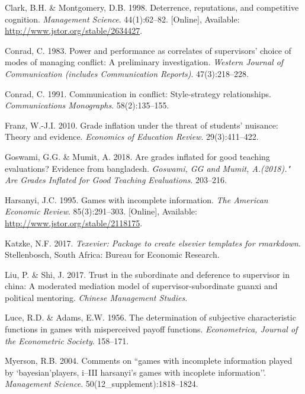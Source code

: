 \documentclass[11pt,preprint, authoryear]{elsarticle}
\numberwithin{equation}{section}
\numberwithin{figure}{section}
\numberwithin{table}{section}
\newlength{\cslhangindent}
\newenvironment{CSLReferences}%
  {\setlength{\parindent}{3pt}%
  \everypar{\setlength{\hangindent}{\cslhangindent}}\ignorespaces}%
  {\par}
\begin{document}
\hypertarget{refs}{}
\begin{CSLReferences}{1}{0}
\leavevmode\hypertarget{ref-deter}{}%
Clark, B.H. \& Montgomery, D.B. 1998. Deterrence, reputations, and
competitive cognition. \emph{Management Science}. 44(1):62--82.
{[}Online{]}, Available: \url{http://www.jstor.org/stable/2634427}.

\leavevmode\hypertarget{ref-power}{}%
Conrad, C. 1983. Power and performance as correlates of supervisors'
choice of modes of managing conflict: A preliminary investigation.
\emph{Western Journal of Communication (includes Communication
Reports)}. 47(3):218--228.

\leavevmode\hypertarget{ref-comm}{}%
Conrad, C. 1991. Communication in conflict: Style-strategy
relationships. \emph{Communications Monographs}. 58(2):135--155.

\leavevmode\hypertarget{ref-2010grade}{}%
Franz, W.-J.I. 2010. Grade inflation under the threat of students'
nuisance: Theory and evidence. \emph{Economics of Education Review}.
29(3):411--422.

\leavevmode\hypertarget{ref-2018grades}{}%
Goswami, G.G. \& Mumit, A. 2018. Are grades inflated for good teaching
evaluations? Evidence from bangladesh. \emph{Goswami, GG and Mumit,
A.(2018)." Are Grades Inflated for Good Teaching Evaluations}. 203--216.

\leavevmode\hypertarget{ref-harsanyi}{}%
Harsanyi, J.C. 1995. Games with incomplete information. \emph{The
American Economic Review}. 85(3):291--303. {[}Online{]}, Available:
\url{http://www.jstor.org/stable/2118175}.

\leavevmode\hypertarget{ref-Texevier}{}%
Katzke, N.F. 2017. \emph{{Texevier}: {P}ackage to create elsevier
templates for rmarkdown}. Stellenbosch, South Africa: Bureau for
Economic Research.

\leavevmode\hypertarget{ref-trust}{}%
Liu, P. \& Shi, J. 2017. Trust in the subordinate and deference to
supervisor in china: A moderated mediation model of
supervisor-subordinate guanxi and political mentoring. \emph{Chinese
Management Studies}.

\leavevmode\hypertarget{ref-luce1956}{}%
Luce, R.D. \& Adams, E.W. 1956. The determination of subjective
characteristic functions in games with misperceived payoff functions.
\emph{Econometrica, Journal of the Econometric Society}. 158--171.

\leavevmode\hypertarget{ref-2004com}{}%
Myerson, R.B. 2004. Comments on ``games with incomplete information
played by `bayesian'players, i--III harsanyi's games with incoplete
information''. \emph{Management Science}. 50(12\_supplement):1818--1824.


\end{CSLReferences}
\end{document}
